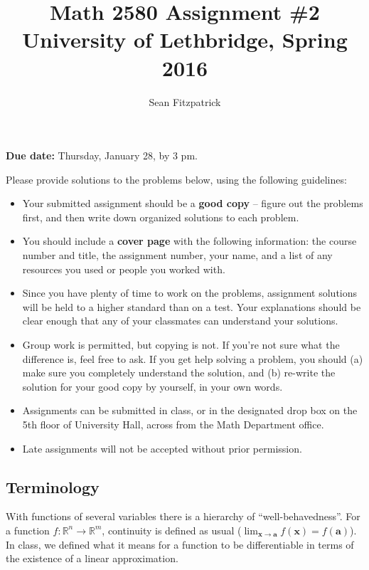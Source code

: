 \documentclass[letterpaper,12pt]{article}
\title{Math 2580 Assignment \#2\\University of Lethbridge, Spring 2016}
\author{Sean Fitzpatrick}
\newcommand{\R}{\mathbb{R}}
\begin{document}
 \maketitle

{\bf Due date:} Thursday, January 28, by 3 pm.

\bigskip

Please provide solutions to the problems below, using the following guidelines:
\begin{itemize}
\item Your submitted assignment should be a {\bf good copy} -- figure out the problems first, and then write down organized solutions to each problem. 
\item You should include a {\bf cover page} with the following information: the course number and title, the assignment number, your name, and a list of any resources you used or people you worked with.
\item Since you have plenty of time to work on the problems, assignment solutions will be held to a higher standard than on a test. Your explanations should be clear enough that any of your classmates can understand your solutions.
\item Group work is permitted, but copying is not. If you're not sure what the difference is, feel free to ask. If you get help solving a problem, you should (a) make sure you completely understand the solution, and (b) re-write the solution for your good copy by yourself, in your own words.
\item Assignments can be submitted in class, or in the designated drop box on the 5th floor of University Hall, across from the Math Department office.
\item Late assignments will not be accepted without prior permission.

\end{itemize}
\newpage

\subsection*{Terminology}
With functions of several variables there is a hierarchy of ``well-behavedness''. For a function $f:\R^n\to\R^m$, continuity is defined as usual ($\lim_{\mathbf{x}\to\mathbf{a}}f(\mathbf{x})=f(\mathbf{a})$).  In class, we defined what it means for a function to be differentiable in terms of the existence of a linear approximation. 
\end{document}
